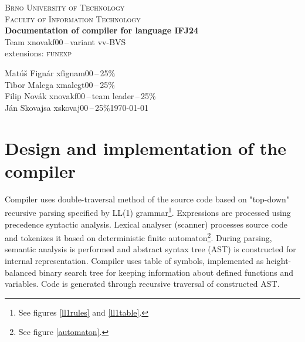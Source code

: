 \documentclass[a4paper, 11pt]{article}
\begin{document}
\begin{titlepage}
    \begin{center}
        \textsc{\Huge{Brno University of Technology\\[0.4em]}
        \huge{Faculty of Information Technology}}\\        
        \huge{\textbf{Documentation of compiler for language \textsc{IFJ24}}}\\
        \LARGE{Team xnovakf00\,--\,variant vv-BVS}\\
        \Large{extensions: \textsc{funexp}}\\
    \end{center}
    \Large{Matúš Fignár xfignam00\,--\,25\%\\
            Tibor Malega xmalegt00\,--\,25\%\\
            Filip Novák xnovakf00\,--\,team leader\,--\,25\%\\
            Ján Skovajsa xskovaj00\,--\,25\%\hfill \today}
\end{titlepage}

\tableofcontents
\newpage
\listoffigures
\newpage



\section{Design and implementation of the compiler}
Compiler uses double-traversal method of the source code based on "top-down" recursive parsing specified by
LL(1) grammar\footnote{See figures \ref{ll1rules} and \ref{ll1table}.}. Expressions are processed using precedence syntactic
analysis. Lexical analyser (scanner) processes source code and tokenizes it based on deterministic finite automaton\footnote{See figure \ref{automaton}.}.
During parsing, semantic analysis is performed and abstract syntax tree (AST) is constructed for internal representation.
Compiler uses table of symbols, implemented as height-balanced binary search tree for keeping information about defined functions and variables.
Code is generated through recursive traversal of constructed AST.
\end{document}
